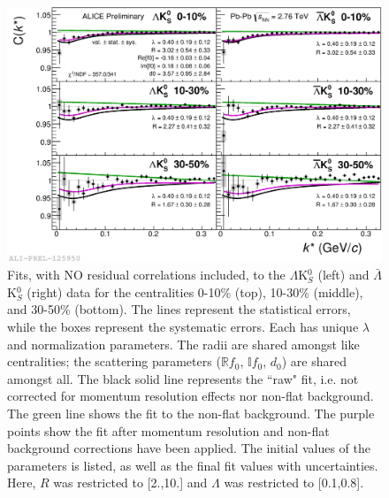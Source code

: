 \documentclass[../AnalysisNoteJBuxton.tex]{subfiles}
\begin{document}
\begin{figure}[h]
  \centering
  \includegraphics[width=\textwidth]{7_ResultsAndDiscussion/Figures/2017-Feb-03-canKStarCfwFitsLamK0wConj_0010_1030_3050_MomResCrctn_NonFlatBgdCrctn_SingleLamParam.png}
  \caption[$\Lambda$K$^{0}_{S}$($\bar{\Lambda}$K$^{0}_{S}$) Fits with No Residuals]{Fits, with NO residual correlations included, to the $\Lambda$K$^{0}_{S}$ (left) and $\bar{\Lambda}$K$^{0}_{S}$ (right) data for the centralities 0-10\% (top), 10-30\% (middle), and 30-50\% (bottom).
The lines represent the statistical errors, while the boxes represent the systematic errors.
Each has unique $\lambda$ and normalization parameters.
The radii are shared amongst like centralities; the scattering parameters ($\mathbb{R}f_{0}$, $\mathbb{I}f_{0}$, $d_{0}$) are shared amongst all.
The black solid line represents the ``raw" fit, i.e. not corrected for momentum resolution effects nor non-flat background.  
The green line shows the fit to the non-flat background.
The purple points show the fit after momentum resolution and non-flat background corrections have been applied.
The initial values of the parameters is listed, as well as the final fit values with uncertainties.
Here, $R$ was restricted to [2.,10.] and $\Lambda$ was restricted to [0.1,0.8].}
  \label{fig:LamK0wConjFits_NoRes}
\end{figure}
\end{document}
